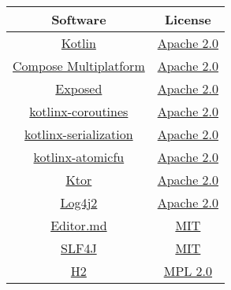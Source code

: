 \documentclass[a4paper]{article}
\begin{document}
    \begin{table}[H]
        \begin{tabular}{c|c}
            Software                                                                         & License                                                                                       \\
            \hline
            \href{https://github.com/JetBrains/kotlin}{Kotlin}                               & \href{https://github.com/JetBrains/kotlin/blob/master/license/LICENSE.txt}{Apache 2.0}        \\
            \href{https://github.com/JetBrains/compose-multiplatform}{Compose Multiplatform} & \href{https://github.com/JetBrains/compose-multiplatform/blob/master/LICENSE.txt}{Apache 2.0} \\
            \href{https://github.com/JetBrains/Exposed}{Exposed}                             & \href{https://github.com/JetBrains/Exposed/blob/main/LICENSE.txt}{Apache 2.0}                 \\
            \href{https://github.com/Kotlin/kotlinx.coroutines}{kotlinx-coroutines}          & \href{https://github.com/Kotlin/kotlinx.coroutines/blob/master/LICENSE.txt}{Apache 2.0}       \\
            \href{https://github.com/Kotlin/kotlinx.serialization}{kotlinx-serialization}    & \href{https://github.com/Kotlin/kotlinx.serialization/blob/master/LICENSE.txt}{Apache 2.0}    \\
            \href{https://github.com/Kotlin/kotlinx-atomicfu}{kotlinx-atomicfu}              & \href{https://github.com/Kotlin/kotlinx-atomicfu/blob/master/LICENSE.txt}{Apache 2.0}         \\
            \href{https://github.com/ktorio/ktor}{Ktor}                                      & \href{https://github.com/ktorio/ktor/blob/main/LICENSE}{Apache 2.0}                           \\
            \href{https://github.com/apache/logging-log4j2}{Log4j2}                          & \href{https://github.com/apache/logging-log4j2/blob/2.x/LICENSE.txt}{Apache 2.0}              \\
            \href{https://github.com/pandao/editor.md}{Editor.md}                            & \href{https://github.com/pandao/editor.md/blob/master/LICENSE}{MIT}                           \\
            \href{https://github.com/qos-ch/slf4j}{SLF4J}                                    & \href{https://github.com/qos-ch/slf4j/blob/master/LICENSE.txt}{MIT}                           \\
            \href{https://www.h2database.com/html/main.html}{H2}                             & \href{https://www.h2database.com/html/license.html}{MPL 2.0}                                  \\
        \end{tabular}
    \end{table}
\end{document}
